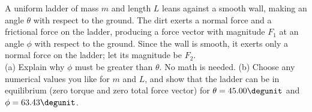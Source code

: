 A uniform ladder of mass $m$ and length $L$ leans against
a smooth wall, making an angle $\theta$ with respect to the
ground. The dirt exerts a normal force and a frictional
force on the ladder, producing a force vector with magnitude
$F_1$ at an angle $\phi $ with respect to the ground. Since
the wall is smooth, it exerts only a normal force on the
ladder; let its magnitude be $F_2$.\\
(a) Explain why $\phi $ must be greater than $\theta$.
No math is needed.\hwendpart
(b) Choose any numerical values you like for $m$ and $L$,
and show that the ladder can be in equilibrium (zero torque
and zero total force vector) for $\theta=45.00\degunit$
and $\phi=63.43\degunit$.
